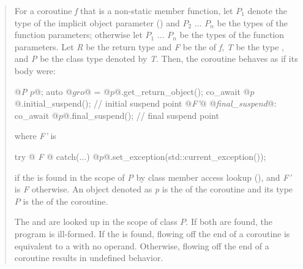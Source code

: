 \begin{quote}
\pnum
For a coroutine \textit{f} that is a non-static member function, let $P_1$ denote the type of the implicit object parameter () and $P_2$ ... $P_n$ be the types of the function parameters; otherwise let $P_1$ ... $P_n$ be the types of the function parameters.
Let \textit{R} be the return type and \textit{F} be the 
of \textit{f}, \textit{T} be the type , and \textit{P} be the class type denoted by \textit{T}. 
Then, the coroutine behaves as if its body were:
\begin{codeblock}
  {
     @\textit{P }$p$@;
     auto @$gro$@ = @$p$@.get_return_object();
     co_await @$p$@.initial_suspend(); // initial suspend point
     @\textit{F'}@
  @\textit{final_suspend}@:
     co_await @$p$@.final_suspend(); // final suspend point
  }
\end{codeblock}
where \textit{F'} is 
\begin{codeblock}
	try {@\textit{ F }@} catch(...) { @$p$@.set_exception(std::current_exception()); }
\end{codeblock}
if the   is found in the scope of \textit{P}
by class member access lookup (), and \textit{F'} is \textit{F} otherwise.
An object denoted as \textit{p} is the  of
the coroutine and its type $P$ is the 
of the coroutine.

\pnum
The 
 and  are looked up in the scope of class $P$. 
If both are found, the program is ill-formed. 
If the   is found, flowing off the end of a coroutine is equivalent to a  with no operand. Otherwise, flowing off the end of a coroutine results in undefined behavior.



\end{quote}
